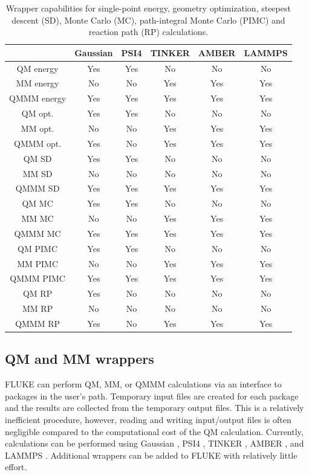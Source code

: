 \documentclass[12pt]{report}
\begin{document}
\begin{table}[hbt]
 \centering
 \begin{tabular}{|c|c c|c c c|}
 \hline
  & Gaussian & PSI4 & TINKER & AMBER & LAMMPS \\ \hline
 QM energy & Yes & Yes & No & No & No \\
 MM energy & No & No & Yes & Yes & Yes \\
 QMMM energy & Yes & Yes & Yes & Yes & Yes \\ \hline
 QM opt. & Yes & Yes & No & No & No \\
 MM opt. & No & No & Yes & Yes & Yes \\
 QMMM opt. & Yes & No & Yes & Yes & Yes \\ \hline
 QM SD & Yes & Yes & No & No & No \\
 MM SD & No & No & No & No & No \\
 QMMM SD & Yes & Yes & Yes & Yes & Yes \\ \hline
 QM MC & Yes & Yes & No & No & No \\
 MM MC & No & No & Yes & Yes & Yes \\
 QMMM MC & Yes & Yes & Yes & Yes & Yes \\ \hline
 QM PIMC & Yes & Yes & No & No & No \\
 MM PIMC & No & No & Yes & Yes & Yes \\
 QMMM PIMC & Yes & Yes & Yes & Yes & Yes \\ \hline
 QM RP & Yes & No & No & No & No \\
 MM RP & No & No & No & No & No \\
 QMMM RP & Yes & No & Yes & Yes & Yes \\ \hline
 \end{tabular}
 \caption{Wrapper capabilities for single-point energy, geometry optimization,
 steepest descent (SD), Monte Carlo (MC), path-integral Monte Carlo (PIMC) and
 reaction path (RP) calculations.}
 \label{tab:WrapCap}
\end{table}

\subsection{QM and MM wrappers}

FLUKE can perform QM, MM, or QMMM calculations via an interface to packages
in the user's path. Temporary input files are created for each package and
the results are collected from the temporary output files. This is a
relatively inefficient procedure, however, reading and writing input/output
files is often negligible compared to the computational cost of the QM
calculation. Currently, calculations can be performed using Gaussian
\cite{Frisch2009}, PSI4 \cite{Turney2012}, TINKER \cite{}, AMBER \cite{}, and
LAMMPS \cite{Plimpton1995}. Additional wrappers can be added to FLUKE with
relatively little effort.
\end{document}
